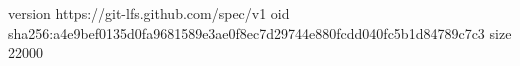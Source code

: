 version https://git-lfs.github.com/spec/v1
oid sha256:a4e9bef0135d0fa9681589e3ae0f8ec7d29744e880fcdd040fc5b1d84789c7c3
size 22000
